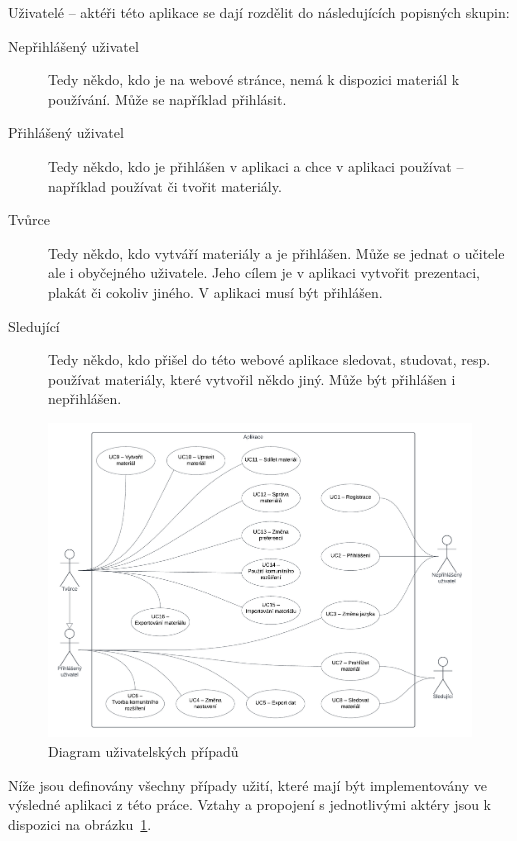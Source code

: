 Uživatelé -- aktéři této aplikace se dají rozdělit do následujících popisných skupin:

\begin{description}
    \item[Nepřihlášený uživatel] Tedy někdo, kdo je na webové stránce, nemá k dispozici materiál k používání. Může se například přihlásit.
    \item[Přihlášený uživatel] Tedy někdo, kdo je přihlášen v aplikaci a chce v aplikaci používat -- například používat či tvořit materiály.
    \item[Tvůrce] Tedy někdo, kdo vytváří materiály a je přihlášen. Může se jednat o učitele ale i obyčejného uživatele. Jeho cílem je v aplikaci vytvořit prezentaci, plakát či cokoliv jiného. V aplikaci musí být přihlášen.
    \item[Sledující] Tedy někdo, kdo přišel do této webové aplikace sledovat, studovat, resp. používat materiály, které vytvořil někdo jiný. Může být přihlášen i nepřihlášen.
\end{description}


\begin{figure}[ht!]
    \centering
    \includegraphics[width=1\textwidth]{media/03_analyza/uzivatelske_pripady.pdf}
    \caption{Diagram uživatelských případů}\label{fig:uzivatelskePripady}
\end{figure}

Níže jsou definovány všechny případy užití, které mají být implementovány ve výsledné aplikaci z této práce.
Vztahy a propojení s jednotlivými aktéry jsou k dispozici na obrázku~\ref{fig:uzivatelskePripady}.

